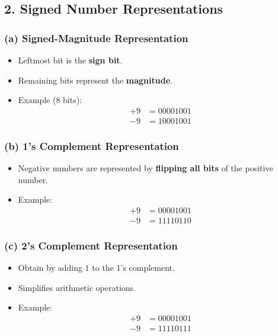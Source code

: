 \documentclass[a4paper,12pt]{article}
\begin{document}
\subsection*{2. Signed Number Representations}

\subsubsection*{(a) Signed-Magnitude Representation}
\begin{itemize}
    \item Leftmost bit is the \textbf{sign bit}.
    \item Remaining bits represent the \textbf{magnitude}.
    \item Example (8 bits):
    \begin{align*}
        +9 & = 00001001 \\
        -9 & = 10001001
    \end{align*}
\end{itemize}

\subsubsection*{(b) 1's Complement Representation}
\begin{itemize}
    \item Negative numbers are represented by \textbf{flipping all bits} of the positive number.
    \item Example:
    \begin{align*}
        +9 & = 00001001 \\
        -9 & = 11110110
    \end{align*}
\end{itemize}

\subsubsection*{(c) 2's Complement Representation}
\begin{itemize}
    \item Obtain by adding $1$ to the 1's complement.
    \item Simplifies arithmetic operations.
    \item Example:
    \begin{align*}
        +9 & = 00001001 \\
        -9 & = 11110111
    \end{align*}
\end{itemize}
\end{document}
